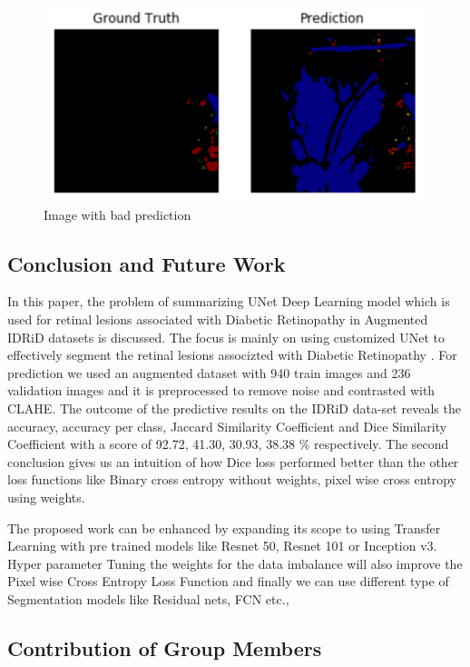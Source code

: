 \documentclass[conference]{IEEEtran}
\begin{document}
\begin{figure}[H]
	\centering
	\includegraphics[width=\linewidth]{image/bad.PNG}
	\caption{Image with bad prediction}
	\label{fig:bad}
\end{figure}

\subsection{Conclusion and Future Work}
In this paper, the problem of summarizing UNet Deep Learning model which is used for retinal lesions associated with Diabetic Retinopathy in Augmented IDRiD datasets is discussed. The focus is mainly on using customized UNet to effectively segment the retinal lesions associzted with Diabetic Retinopathy \cite{monoclonal1} . For prediction we used an augmented dataset with 940 train images and 236 validation images and it is preprocessed to remove noise and contrasted with CLAHE. The outcome of the predictive results on the IDRiD data-set reveals the accuracy, accuracy per class, Jaccard Similarity Coefficient and Dice Similarity Coefficient with a score of 92.72, 41.30, 30.93, 38.38 \% respectively. The second conclusion gives us an intuition of how Dice loss performed better than the other loss functions like Binary cross entropy without weights, pixel wise cross entropy using weights.
\par 
The proposed work can be enhanced by expanding its scope to using Transfer Learning with pre trained models like Resnet 50, Resnet 101 or Inception v3. Hyper parameter Tuning the weights for the data imbalance will also improve the Pixel wise Cross Entropy Loss Function and finally we can use different type of Segmentation models like Residual nets, FCN etc.,

\subsection{Contribution of Group Members}
\par
\end{document}
